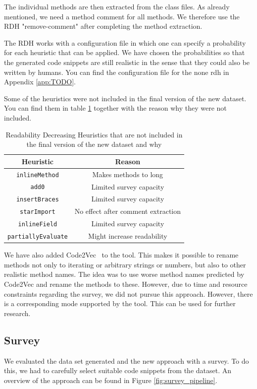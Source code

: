 \documentclass[%
class=scrreprt,
chapterprefix=false,%
open=right,%
twoside=false,%
paper=a4,%
logofile={Logo\_zentral\_farbig\_EN.png},%
thesistype=master,%
UKenglish,%
]{se2thesis}
\theoremstyle{definition}
\begin{document}
	The individual methods are then extracted from the class files. As already mentioned, we need a method comment for all methods. We therefore use the RDH "remove-comment" after completing the method extraction.
	
	The RDH works with a configuration file in which one can specify a probability for each heuristic that can be applied. We have chosen the probabilities so that the generated code snippets are still realistic in the sense that they could also be written by humans. You can find the configuration file for the none rdh in Appendix \ref{app:TODO}.
	
	Some of the heuristics were not included in the final version of the new dataset. You can find them in table \ref{tab:not-included-rdhs} together with the reason why they were not included.
	
	\begin{table}[h]
		\centering
		\begin{tabular}{|c|c|}
			\hline
			\textbf{Heuristic} & \textbf{Reason} \\
			\hline
			\texttt{inlineMethod} & Makes methods to long \\
			\hline
			\texttt{add0} & Limited survey capacity \\
			\hline
			\texttt{insertBraces} & Limited survey capacity \\
			\hline
			\texttt{starImport} & No effect after comment extraction \\
			\hline
			\texttt{inlineField} & Limited survey capacity \\
			\hline
			\texttt{partiallyEvaluate} & Might increase readability \\
			\hline
		\end{tabular}
		\caption{Readability Decreasing Heuristics that are not included in the final version of the new dataset and why}
		\label{tab:not-included-rdhs}
	\end{table}
	
	We have also added Code2Vec~\cite{alon2019code2vec} to the tool. This makes it possible to rename methods not only to iterating or arbitrary strings or numbers, but also to other realistic method names. The idea was to use worse method names predicted by Code2Vec and rename the methods to these. However, due to time and resource constraints regarding the survey, we did not pursue this approach.	However, there is a corresponding mode supported by the tool. This can be used for further research.
	
\subsection{Survey} \label{Survey}
	We evaluated the data set generated and the new approach with a survey. To do this, we had to carefully select suitable code snippets from the dataset. An overview of the approach can be found in Figure \ref{fig:survey_pipeline}.
	
\end{document}
